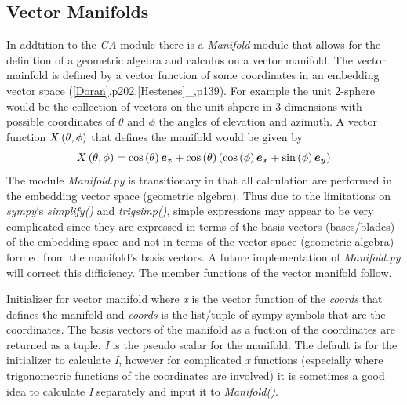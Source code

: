 \documentclass[letterpaper,10pt,english]{sphinxmanual}
\begin{document}
\subsection{Vector Manifolds}
\label{GA:vector-manifolds}
In addtition to the \emph{GA} module there is a \emph{Manifold} module that allows
for the definition of a geometric algebra and calculus on a vector manifold.
The vector mainfold is defined by a vector function of some coordinates
in an embedding vector space ({\hyperref[GA:doran]{{[}Doran{]}}},p202,{[}Hestenes{]}\_,p139).  For example the unit 2-sphere would be the
collection of vectors on the unit shpere in 3-dimensions with possible
coordinates of $\theta$ and $\phi$ the angles of elevation and
azimuth.  A vector function ${X}\left ( {\theta,\phi} \right )$ that defines the manifold
would be given by
   \begin{equation*}
      {X}\left ( {\theta,\phi} \right ) = {\cos}\left ( {\theta} \right )\boldsymbol{e_{z}}+{\cos}\left ( {\theta} \right )\left ( {{\cos}\left ( {\phi} \right )\boldsymbol{e_{x}}+{\sin}\left ( {\phi} \right )\boldsymbol{e_{y}}} \right )
   \end{equation*}
The module \emph{Manifold.py} is transitionary in that all calculation are performed in the embedding vector space (geometric algebra).
Thus due to the limitations on \emph{sympy}`s \emph{simplify()} and  \emph{trigsimp()}, simple expressions may appear to be very complicated since they are expressed
in terms of the basis vectors (bases/blades) of the embedding space and not in terms of the vector space (geometric algebra) formed
from the manifold's basis vectors.  A future implementation of \emph{Manifold.py} will correct this difficiency. The member functions of
the vector manifold follow.

\begin{fulllineitems}
\label{GA:Manifold}
Initializer for vector manifold where \emph{x} is the vector function of the \emph{coords} that defines the manifold and \emph{coords} is the list/tuple
of sympy symbols that are the coordinates.  The basis vectors of the manifold as a fuction of the coordinates are returned as a tuple. \emph{I}
is the pseudo scalar for the manifold.  The default is for the initializer to calculate \emph{I}, however for complicated \emph{x} functions (especially
where trigonometric functions of the coordinates are involved) it is sometimes a good idea to calculate \emph{I} separately and input it to \emph{Manifold()}.

\end{fulllineitems}
\end{document}
